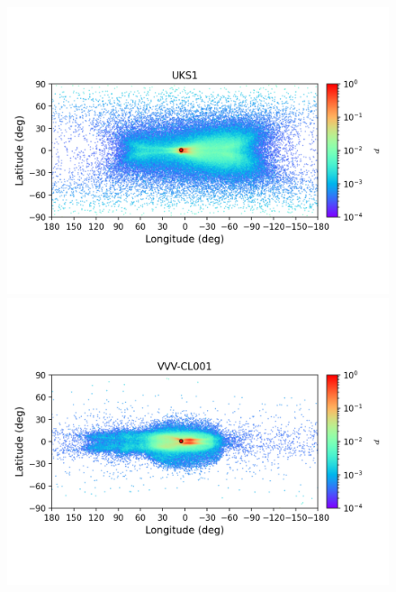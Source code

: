 \begin{figure}
\begin{center}
                \includegraphics[clip=true, trim = 0mm 20mm 0mm 10mm, width=1\columnwidth]{images/error_plots_UKS1.png}
                \includegraphics[clip=true, trim = 0mm 20mm 0mm 10mm, width=1\columnwidth]{images/error_plots_VVV-CL001.png}
                

\end{center}
\end{figure}
